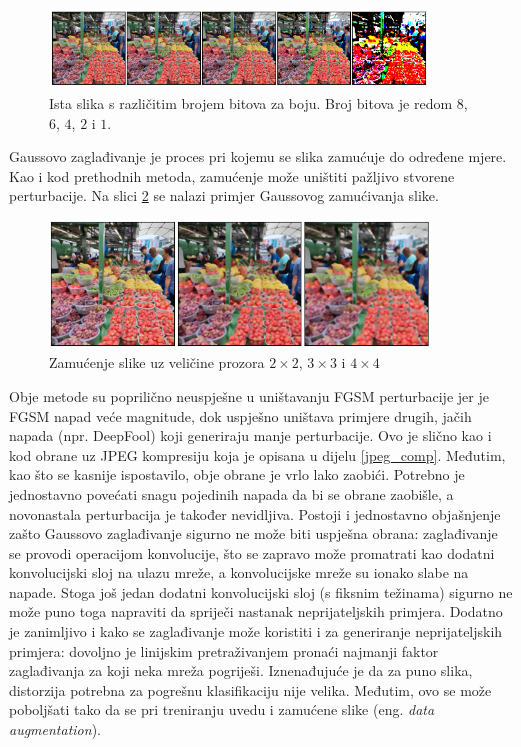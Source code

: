 \documentclass[utf8, diplomski]{fer}
\begin{document}
\begin{figure}[H]
\centering
\includegraphics[width=0.9\textwidth,keepaspectratio]{img/other/squeeze_86421.png}
\caption{Ista slika s različitim brojem bitova za boju. Broj bitova je redom $8$, $6$, $4$, $2$ i $1$.}
\label{fig:squeeze_bits}
\end{figure}

Gaussovo zaglađivanje je proces pri kojemu se slika zamućuje do određene mjere. Kao i kod prethodnih metoda, zamućenje može uništiti pažljivo stvorene perturbacije. Na slici \ref{fig:blur_example} se nalazi primjer Gaussovog zamućivanja slike. 

\begin{figure}[H]
\centering
\includegraphics[width=0.9\textwidth,keepaspectratio]{img/other/blur_example.png}
\caption{Zamućenje slike uz veličine prozora $2\times2$, $3\times3$ i $4\times4$}
\label{fig:blur_example}
\end{figure}

\par 

Obje metode su poprilično neuspješne u uništavanju FGSM perturbacije jer je FGSM napad veće magnitude, dok uspješno uništava primjere drugih, jačih napada (npr. DeepFool) koji generiraju manje perturbacije. Ovo je slično kao i kod obrane uz JPEG kompresiju koja je opisana u dijelu \ref{jpeg_comp}. Međutim, kao što se kasnije ispostavilo\citep{bypass_squeezing}, obje obrane je vrlo lako zaobići. Potrebno je jednostavno povećati snagu pojedinih napada da bi se obrane zaobišle, a novonastala perturbacija je također nevidljiva. Postoji i jednostavno objašnjenje zašto Gaussovo zaglađivanje sigurno ne može biti uspješna obrana: zaglađivanje se provodi operacijom konvolucije, što se zapravo može promatrati kao dodatni konvolucijski sloj na ulazu mreže, a konvolucijske mreže su ionako slabe na napade. Stoga još jedan dodatni konvolucijski sloj (s fiksnim težinama) sigurno ne može puno toga napraviti da spriječi nastanak neprijateljskih primjera. Dodatno je zanimljivo i kako se zaglađivanje može koristiti i za generiranje neprijateljskih primjera: dovoljno je linijskim pretraživanjem pronaći najmanji faktor zaglađivanja za koji neka mreža pogriješi. Iznenađujuće je da za puno slika, distorzija potrebna za pogrešnu klasifikaciju nije velika. Međutim, ovo se može poboljšati tako da se pri treniranju uvedu i zamućene slike (eng. \textit{data augmentation}).
\end{document}
